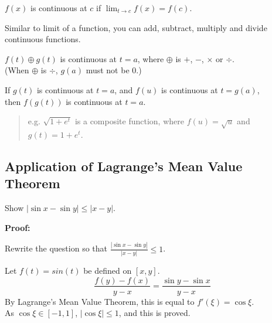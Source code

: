 $f(x)$ is continuous at $c$ if $\lim_{t\to c} f(x) = f(c)$.

Similar to limit of a function, you can add, subtract, multiply and divide continuous functions.

$f(t) \oplus g(t)$ is continuous at $t = a$, where $\oplus$ is $+$, $-$, $\times$ or $\div$.\\
(When $\oplus$ is $\div$, $g(a)$ must not be 0.)

If $g(t)$ is continuous at $t = a$, and $f(u)$ is continuous at $t = g(a)$,\\
then $f(g(t))$ is continuous at $t = a$.

\begin{quote}
    e.g. $\sqrt{1+e^t}$ is a composite function, where
        $f(u) = \sqrt{u}$ and $g(t) = 1 + e^t$.
\end{quote}

\subsection{Application of Lagrange's Mean Value Theorem}

Show $|\sin x - \sin y| \leq |x - y|$.

\textbf{Proof:}

Rewrite the question so that $\frac{|\sin x - \sin y|}{|x - y|} \leq 1$.

Let $f(t) = sin(t)$ be defined on $[x, y]$.\\
$$\frac{f(y) - f(x)}{y - x} = \frac{\sin y - \sin x}{y - x}$$
By Lagrange's Mean Value Theorem, this is equal to $f'(\xi) = \cos \xi$.\\
As $\cos\xi \in [-1, 1]$, $|\cos\xi| \leq 1$, and this is proved.